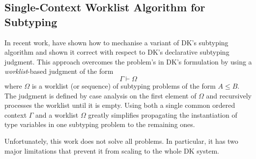 % 
% 
% 
\subsection{Single-Context Worklist Algorithm for Subtyping}

In recent work, \citet{itp2018} have shown how to mechanise a variant of DK's
subtyping algorithm and shown it correct with respect to DK's declarative
subtyping judgment. This approach overcomes the problem's in DK's formulation
by using a \emph{worklist}-based judgment of the form $$\Gamma \vdash \Omega$$
where $\Omega$ is a worklist (or sequence) of subtyping problems of the
form $A \leq B$.  The judgment is defined by case analysis on the first
element of $\Omega$ and recursively processes the worklist until it is empty.
Using both a single common ordered context $\Gamma$ and a worklist $\Omega$ greatly
simplifies propagating the instantiation of type variables in one
subtyping problem to the remaining ones.

Unfortunately, this work does not solve all problems. In particular, it has two
major limitations that prevent it from scaling to the whole DK system. 

